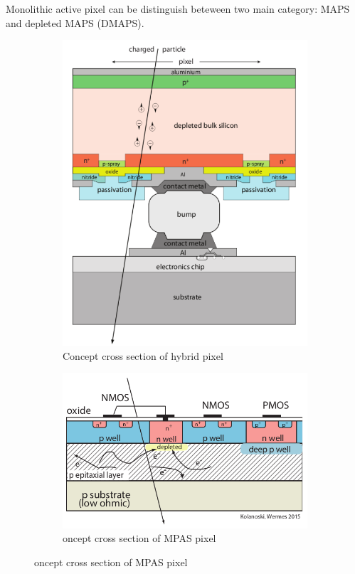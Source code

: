 Monolithic active pixel can be distinguish beteween two main category: MAPS and depleted
MAPS (DMAPS).
\begin{figure}
   \begin{subfigure}{.5\textwidth}
     \centering
     \includegraphics[width=.6\linewidth]{figures/hybrid_scheme.png}
     \caption{Concept cross section of hybrid pixel}
     \label{fig:hybrid_scheme}
   \end{subfigure}%
   \begin{subfigure}{.5\textwidth}
     \centering
     \includegraphics[width=.8\linewidth]{figures/MAPS_scheme.png}
     \caption{oncept cross section of MPAS pixel}
     \label{fig:MAPS_scheme}
   \end{subfigure}
\end{figure}

